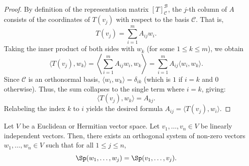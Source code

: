 \begin{proof}
    By definition of the representation matrix $[T]_{\mathcal{C}}^{\mathcal{B}}$, the $j$-th column of $A$ consists of the coordinates of $T(v_j)$ with respect to the basis $\mathcal{C}$. That is,
    \begin{equation*}
        T(v_j) = \sum_{i=1}^m A_{ij} w_i.
    \end{equation*}
    Taking the inner product of both sides with $w_k$ (for some $1 \leq k \leq m$), we obtain
    \begin{equation*}
        \langle T(v_j), w_k \rangle = \left\langle \sum_{i=1}^m A_{ij} w_i, w_k \right\rangle = \sum_{i=1}^m A_{ij} \langle w_i, w_k \rangle.
    \end{equation*}
    Since $\mathcal{C}$ is an orthonormal basis, $\langle w_i, w_k \rangle = \delta_{ik}$ (which is $1$ if $i=k$ and $0$ otherwise). Thus, the sum collapses to the single term where $i=k$, giving:
    \begin{equation*}
        \langle T(v_j), w_k \rangle = A_{kj}.
    \end{equation*}
    Relabeling the index $k$ to $i$ yields the desired formula $A_{ij} = \langle T(v_j), w_i \rangle$.
\end{proof}

\begin{theorem}
    \label{thm:gram_schmidt}
    Let $V$ be a Euclidean or Hermitian vector space. Let $v_1, \dots, v_n \in V$ be linearly independent vectors. Then, there exists an orthogonal system of non-zero vectors $w_1, \dots, w_n \in V$ such that for all $1 \leq j \leq n$,
    \begin{equation*}
        \Sp(w_1, \dots, w_j) = \Sp(v_1, \dots, v_j).
    \end{equation*}
\end{theorem}

